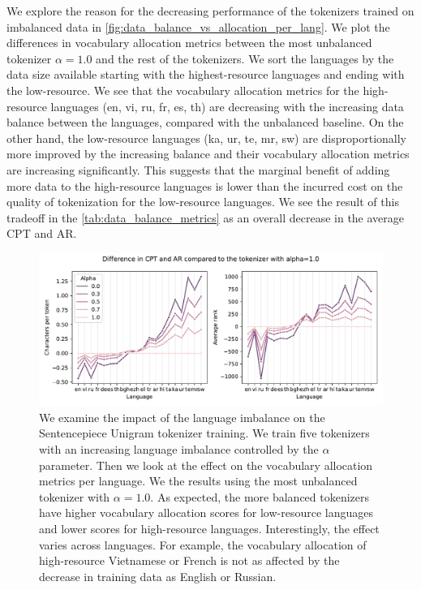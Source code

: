 We explore the reason for the decreasing performance of the tokenizers trained on imbalanced data in \autoref{fig:data_balance_vs_allocation_per_lang}. We plot the differences in vocabulary allocation metrics between the most unbalanced tokenizer $\alpha=1.0$ and the rest of the tokenizers. We sort the languages by the data size available starting with the highest-resource languages and ending with the low-resource. We see that the vocabulary allocation metrics for the high-resource languages (en, vi, ru, fr, es, th) are decreasing with the increasing data balance between the languages, compared with the unbalanced baseline. On the other hand, the low-resource languages (ka, ur, te, mr, sw) are disproportionally more improved by the increasing balance and their vocabulary allocation metrics are increasing significantly. This suggests that the marginal benefit of adding more data to the high-resource languages is lower than the incurred cost on the quality of tokenization for the low-resource languages. We see the result of this tradeoff in the \autoref{tab:data_balance_metrics} as an overall decrease in the average CPT and AR.

\begin{figure}[H]
    \centering
    \includegraphics[width=\textwidth]{figures/ar_cpt_vs_alpha.pdf}
    \caption{We examine the impact of the language imbalance on the Sentencepiece Unigram tokenizer training. We train five tokenizers with an increasing language imbalance controlled by the $\alpha$ parameter. Then we look at the effect on the vocabulary allocation metrics per language. We  the results using the most unbalanced tokenizer with $\alpha=1.0$. As expected, the more balanced tokenizers have higher vocabulary allocation scores for low-resource languages and lower scores for high-resource languages. Interestingly, the effect varies across languages. For example, the vocabulary allocation of high-resource Vietnamese or French is not as affected by the decrease in training data as English or Russian.}
    \label{fig:data_balance_vs_allocation_per_lang}
\end{figure}
